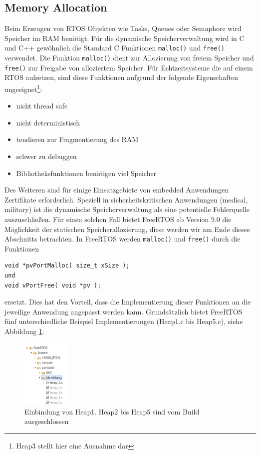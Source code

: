 \documentclass[ngerman]{seminarvorlage}
\begin{document}
\subsection{Memory Allocation}
Beim Erzeugen von RTOS Objekten wie Tasks, Queues oder Semaphore wird Speicher im RAM benötigt. Für die dynamische Speicherverwaltung wird in C und C++ ge\-wöhnlich die Standard C Funktionen \verb|malloc()| und \verb|free()| verwendet. Die Funktion \verb|malloc()| dient zur Allozierung von freiem Speicher und \verb|free()| zur Freigabe von alloziertem Speicher. Für Echtzeitsysteme die auf einem RTOS aufsetzen, sind diese Funktionen aufgrund der folgende Eigenschaften\cite{MasteringFreeRtos} ungeeignet\footnote{Heap3 stellt hier eine Ausnahme dar}:
\begin{itemize}
	\item nicht thread safe
	\item nicht deterministisch
	\item tendieren zur Fragmentierung des RAM
	\item schwer zu debuggen
	\item Bibliotheksfunktionen benötigen viel Speicher
\end{itemize}
Des Weiteren sind für einige Einsatzgebiete von embedded Anwendungen Zertifikate erforderlich. Speziell in sicherheitskritischen Anwendungen (medical, military) ist die dynamische Speicherverwaltung als eine potentielle Fehlerquelle auszuschließen. Für einen solchen Fall bietet FreeRTOS ab Version 9.0 die Möglichkeit der statischen Speicherallozierung, diese werden wir am Ende dieses Abschnitts betrachten. In FreeRTOS werden  \verb|malloc()| und \verb|free()| durch die Funktionen  
\begin{lstlisting}[label=lst:vPortMallocFree, numbers = none]
void *pvPortMalloc( size_t xSize );
und
void vPortFree( void *pv );
\end{lstlisting}
ersetzt. Dies hat den Vorteil, dass die Implementierung dieser Funktionen an die jeweilige Anwendung angepasst werden kann. Grundsätzlich bietet FreeRTOS fünf unterschiedliche Beispiel Implementierungen (Heap1.c bis Heap5.c), siehe Abbildung \ref{fig:HeapsEclipse}. 
\begin{figure}[hb!]
	\centering
		\includegraphics[width=0.2\textwidth]{Pictures/Eclipse/Heaps.png}
	\caption{Einbindung von Heap1. Heap2 bis Heap5 sind vom Build ausgeschlossen}
	\label{fig:HeapsEclipse}
\end{figure}   
\end{document}

